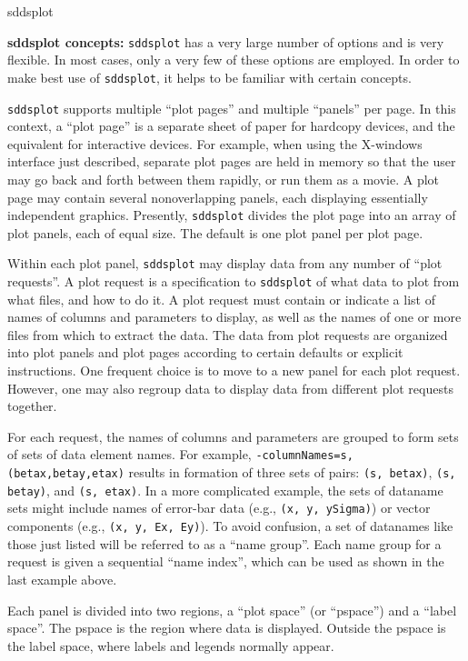 \begin{sddsprog}{sddsplot}
  \item \textbf{sddsplot concepts:}
\verb|sddsplot| has a very large number of options and is very flexible.   In most cases, only a very few
of these options are employed.  In order to make best use of \verb|sddsplot|, it helps to be familiar with
certain concepts. 

\verb|sddsplot| supports multiple ``plot pages'' and multiple ``panels'' per page.  In this context, a
``plot page'' is a separate sheet of paper for hardcopy devices, and the equivalent for interactive
devices.  For example, when using the X-windows interface just described, separate plot pages are held in
memory so that the user may go back and forth between them rapidly, or run them as a movie.  A plot page
may contain several nonoverlapping panels, each displaying essentially independent graphics.  Presently,
\verb|sddsplot| divides the plot page into an array of plot panels, each of equal size.  The default is one
plot panel per plot page.

Within each plot panel, \verb|sddsplot| may display data from any number of ``plot requests''.  A plot
request is a specification to \verb|sddsplot| of what data to plot from what files, and how to do it.  A plot
request must contain or indicate a list of names of columns and parameters to display, as well as the names
of one or more files from which to extract the data.  The data from plot requests are organized into plot
panels and plot pages according to certain defaults or explicit instructions.  One frequent choice is to
move to a new panel for each plot request.  However, one may also regroup data to display data from
different plot requests together.

For each request, the names of columns and parameters are grouped to form sets of sets of data
element names.  For example, {\tt -columnNames=s,(betax,betay,etax)} results in formation of three
sets of pairs: {\tt (s, betax)}, {\tt (s, betay)}, and {\tt (s, etax)}.  In a more complicated
example, the sets of dataname sets might include names of error-bar data (e.g., {\tt (x, y, ySigma)})
or vector components (e.g., {\tt (x, y, Ex, Ey)}).  To avoid confusion, a set of datanames like those
just listed will be referred to as a ``name group''.  Each name group for a request is given a
sequential ``name index'', which can be used as shown in the last example above.

Each panel is divided into two regions, a ``plot space'' (or ``pspace'') and a ``label space''.  The
pspace is the region where data is displayed.  Outside the pspace is the label space, where labels
and legends normally appear.


\end{sddsprog}
